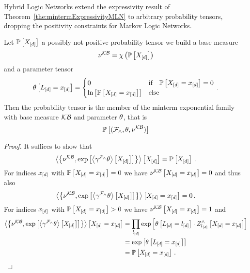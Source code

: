 Hybrid Logic Networks extend the expressivity result of Theorem~\ref{the:mintermExpressivityMLN} to arbitrary probability tensors, dropping the positivity constraints for Markov Logic Networks.

\begin{theorem}\label{the:mintermExpressivityHLN}
	Let $\mathbb{P}\left[X_{[d]}\right]$ a possibly not positive probability tensor we build a base measure
		\[ \nu^{\mathcal{KB}} = \chi\left(\mathbb{P}\left[X_{[d]}\right]\right) \]
	and a parameter tensor
	\begin{align*}
		\theta\left[L_{[d]}=x_{[d]}\right]
		= \begin{cases}
			0 & \text{if} \quad \mathbb{P}\left[X_{[d]}=x_{[d]}\right] = 0  \\
			\ln \left[ \mathbb{P}\left[X_{[d]}=x_{[d]}\right] \right] & \text{else} 
		\end{cases} \, . 
	\end{align*}
	Then the probability tensor is the member of the minterm exponential family with base measure $\mathcal{KB}$ and parameter $\theta$, that is
		\[ \mathbb{P}\left[(\mathcal{F}_{\land},\theta,\nu^{\mathcal{KB}})\right]\]
\end{theorem}
\begin{proof}
	It suffices to show that 
		\[ \left\langle \left\{\nu^{\mathcal{KB}}, \mathrm{exp}\left[\left\langle 
		\gamma^{\mathcal{F}_{\land}}\theta
		\right\rangle \left[ 
		X_{[d]}
		 \right]\right]\right\}\right\rangle \left[ X_{[d]} \right] = \mathbb{P}\left[X_{[d]}\right] \, . \]
	For indices $x_{[d]}$ with $\mathbb{P}\left[X_{[d]}=x_{[d]}\right]=0$ we have $\nu^{\mathcal{KB}}\left[X_{[d]}=x_{[d]}\right]=0$ and thus also 
		\[ \left\langle \left\{\nu^{\mathcal{KB}}, \mathrm{exp}\left[\left\langle 
		\gamma^{\mathcal{F}_{\land}}\theta
		\right\rangle \left[ 
		X_{[d]}
		 \right]\right]\right\}\right\rangle \left[ X_{[d]}=x_{[d]} \right] = 0 \, . \]
	For indices $x_{[d]}$ with $\mathbb{P}\left[X_{[d]}=x_{[d]}\right]>0$ we have $\nu^{\mathcal{KB}}\left[X_{[d]}=x_{[d]}\right]=1$ and
	\begin{align*}
		 \left\langle \left\{\nu^{\mathcal{KB}}, \mathrm{exp}\left[\left\langle 
		\gamma^{\mathcal{F}_{\land}}\theta
		\right\rangle \left[ 
		X_{[d]}
		 \right]\right]\right\}\right\rangle \left[ X_{[d]}=x_{[d]} \right] 
		&= \prod_{l_{[d]}} \mathrm{exp}\left[\theta\left[L_{[d]}=l_{[d]}\right] \cdot Z^{\land}_{l_{[d]}}\left[X_{[d]}=x_{[d]}\right]\right] \\
		&=  \mathrm{exp}\left[\theta\left[L_{[d]}=x_{[d]}\right]\right] \\
		&=  \mathbb{P}\left[X_{[d]}=x_{[d]}\right] \, .
	\end{align*}
\end{proof}




